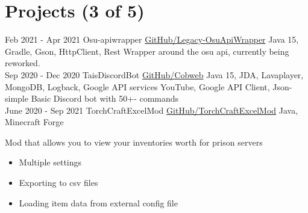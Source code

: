 \documentclass[letterpaper]{twentysecondcv} %
\begin{document}
\section{Projects (3 of 5)}
\begin{twenty} %
	\twentyitem
    		{Feb 2021 -}
		{Apr 2021}
        		{Osu-apiwrapper}
        		{\href{https://github.com/Tais993/Legacy-OsuApiWrapper}{GitHub/Legacy-OsuApiWrapper}}
        		{Java 15, Gradle, Gson, HttpClient, Rest}
        		{Wrapper around the osu api, currently being reworked.}\\
	\twentyitem
    		{Sep 2020 -}
		{Dec 2020}
        		{TaisDiscordBot}
        		{\href{https://github.com/Tais993/taisdiscordbot}{GitHub/Cobweb}}
        		{Java 15, JDA, Lavaplayer, MongoDB, Logback, Google API services YouTube, Google API Client, Json-simple}
        		{Basic Discord bot with 50+- commands}\\
	\twentyitem
    		{June 2020 -}
		{Sep 2021}
        		{TorchCraftExcelMod}
        		{\href{https://github.com/Tais993/TorchCraftExcelMod}{GitHub/TorchCraftExcelMod}}
        		{Java, Minecraft Forge}
        		{
        		Mod that allows you to view your inventories worth for prison servers
        		\begin{itemize}
        			\item Multiple settings
        			\item Exporting to csv files
        			\item Loading item data from external config file
        		\end{itemize}}\\
\end{twenty}
\end{document}
